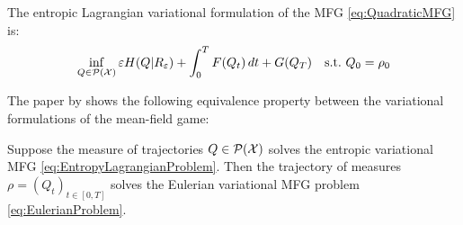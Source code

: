 \documentclass[../report.tex]{subfiles}
\begin{document}
The entropic Lagrangian variational formulation of the MFG \eqref{eq:QuadraticMFG} is:
\begin{equation}\label{eq:EntropyLagrangianProblem}
	\inf_{Q\in\mathcal{P}(\mathcal{X})}
	\varepsilon H(Q|R_{\varepsilon}) + \int_0^T F(Q_t)\,dt + G(Q_T)\quad
	\mathrm{s.t.}\ Q_0 = \rho_0
\end{equation}


The paper by \textcite[sec.~4.2]{benamou2018entropy} shows the following equivalence property between the variational formulations of the mean-field game:
\begin{prop}
	Suppose the measure of trajectories $Q \in \mathcal{P}(\mathcal{X})$ solves the entropic variational MFG \eqref{eq:EntropyLagrangianProblem}. Then the trajectory of measures $\rho = (Q_t)_{t\in[0,T]}$ solves the Eulerian variational MFG problem \eqref{eq:EulerianProblem}.
\end{prop}
\end{document}
